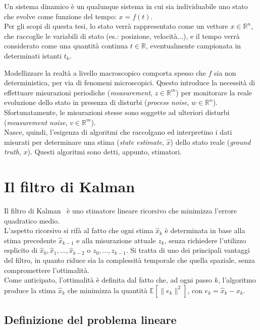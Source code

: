 \documentclass[12pt,a4paper,openright,twoside]{book}
\begin{document}
Un sistema dinamico è un qualunque sistema in cui sia individuabile uno stato che evolve come funzione del tempo: $x=f(t)$. \\
Per gli scopi di questa tesi, lo stato verrà rappresentato come un vettore $x\in\mathbb{R}^n$, che raccoglie le variabili di stato (es.: posizione, velocità...), e il tempo verrà considerato come una quantità continua $t\in\mathbb{R}$, eventualmente campionata in determinati istanti $t_k$.

Modellizzare la realtà a livello macroscopico comporta spesso che $f$ sia non deterministica, per via di fenomeni microscopici. Questo introduce la necessità di effettuare misurazioni periodiche (\textit{measurement}, $z\in\mathbb{R}^m$) per monitorare la reale evoluzione dello stato in presenza di disturbi (\textit{process noise}, $w\in\mathbb{R}^n$). \\
Sfortunatamente, le misurazioni stesse sono soggette ad ulteriori disturbi (\textit{measurement noise}, $v\in\mathbb{R}^m$). \\
Nasce, quindi, l'esigenza di algoritmi che raccolgano ed interpretino i dati misurati per determinare una stima (\textit{state estimate}, $\hat{x}$) dello stato reale (\textit{ground truth}, $x$). Questi algoritmi sono detti, appunto, stimatori.

\section{Il filtro di Kalman}

Il filtro di Kalman~\cite{10.1115/1.3662552} è uno stimatore lineare ricorsivo che minimizza l'errore quadratico medio. \\
L'aspetto ricorsivo si rifà al fatto che ogni stima $\hat{x}_k$ è determinata in base alla stima precedente $\hat{x}_{k-1}$ e alla misurazione attuale $z_k$, senza richiedere l'utilizzo esplicito di $\hat{x}_0,\hat{x}_1,...,\hat{x}_{k-2}$ o $z_0,...,z_{k-1}$. Si tratta di uno dei principali vantaggi del filtro, in quanto riduce sia la complessità temporale che quella spaziale, senza compromettere l'ottimalità. \\
Come anticipato, l'ottimalità è definita dal fatto che, ad ogni passo $k$, l'algoritmo produce la stima $\hat{x}_k$ che minimizza la quantità $\mathbb{E}[\lVert e_k\rVert^2]$, con $e_k=\hat{x}_k-x_k$. \\

\subsection{Definizione del problema lineare}
\end{document}
